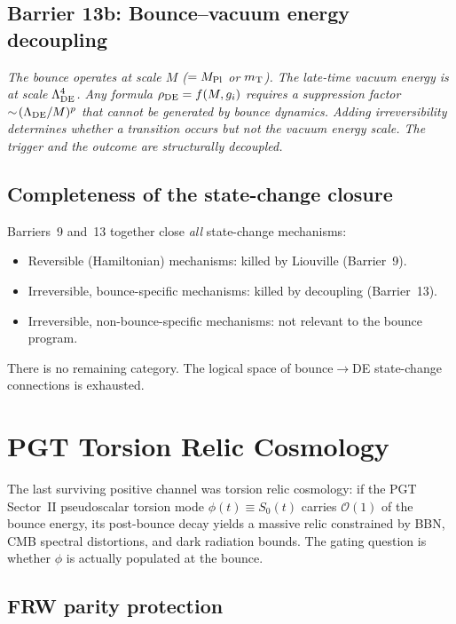 \documentclass[aps,prd,twocolumn,superscriptaddress,showpacs,preprintnumbers,
  nofootinbib,longbibliography,floatfix]{revtex4-2}
\newcommand{\MPl}{M_{\rm Pl}}
\newcommand{\mT}{m_{\rm T}}
\begin{document}
\subsection{Barrier 13b: Bounce--vacuum energy decoupling}

\textit{The bounce operates at scale $M$ ($= \MPl$ or $\mT$). The
late-time vacuum energy is at scale $\Lambda_{\rm DE}^4$. Any formula
$\rho_{\rm DE} = f(M, g_i)$ requires a suppression factor
$\sim\!(\Lambda_{\rm DE}/M)^p$ that cannot be generated by bounce
dynamics. Adding irreversibility determines whether a transition occurs
but not the vacuum energy scale. The trigger and the outcome are
structurally decoupled.}

\subsection{Completeness of the state-change closure}

Barriers~9 and~13 together close \textit{all} state-change mechanisms:
\begin{itemize}[leftmargin=*]
  \item Reversible (Hamiltonian) mechanisms: killed by Liouville
    (Barrier~9).
  \item Irreversible, bounce-specific mechanisms: killed by decoupling
    (Barrier~13).
  \item Irreversible, non-bounce-specific mechanisms: not relevant to the
    bounce program.
\end{itemize}
There is no remaining category. The logical space of bounce$\to$DE
state-change connections is exhausted.


\section{PGT Torsion Relic Cosmology}\label{sec:relic}

The last surviving positive channel was torsion relic cosmology: if the
PGT Sector~II pseudoscalar torsion mode $\phi(t) \equiv S_0(t)$ carries
$\mathcal{O}(1)$ of the bounce energy, its post-bounce decay yields a
massive relic constrained by BBN, CMB spectral distortions, and dark
radiation bounds. The gating question is whether $\phi$ is actually
populated at the bounce.

\subsection{FRW parity protection}
\end{document}
